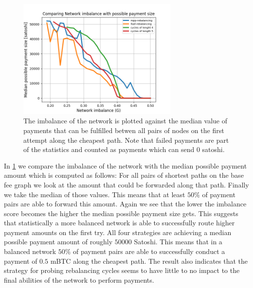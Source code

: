 \documentclass[a4paper]{paper}
\begin{document}
\begin{figure}
 \centering
 \includegraphics[width=8cm]{code/vs/fig/imba_vs_median_payment_size.png}
 \caption{The imbalance of the network is plotted against the median value of payments that can be fulfilled betwen all pairs of nodes on the first attempt along the cheapest path. Note that failed payments are part of the statistics and counted as payments which can send $0$ satoshi.}
 \label{fig:imba_vs_payment_size}
\end{figure}

In \cref{fig:imba_vs_payment_size} we compare the imbalance of the network with the median possible payment amount which is computed as follows:
For all pairs of shortest paths on the base fee graph we look at the amount that could be forwarded along that path.
Finally we take the median of those values.
This means that at least $50\%$ of payment pairs are able to forward this amount.
Again we see that the lower the imbalance score becomes the higher the median possible payment size gets.
This suggests that statistically a more balanced network is able to successfully route higher payment amounts on the first try.
All four strategies are achieving a median possible payment amount of roughly $50000$ Satoshi.
This means that in a balanced network $50\%$ of payment pairs are able to successfully conduct a payment of $0.5$ mBTC along the cheapest path. 
The result also indicates that the strategy for probing rebalancing cycles seems to have little to no impact to the final abilities of the network to perform payments.


\end{document}
